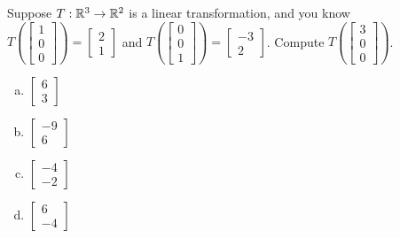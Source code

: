 \begin{applicationActivities}{1}{17}
\begin{activity}{5}
Suppose $T: \mathbb{R}^3 \rightarrow \mathbb{R}^2$ is a linear transformation, and you know $T\left(\begin{bmatrix} 1 \\ 0 \\ 0 \end{bmatrix} \right) = \begin{bmatrix} 2 \\ 1 \end{bmatrix} $ and $T\left(\begin{bmatrix} 0 \\ 0 \\ 1 \end{bmatrix} \right) = \begin{bmatrix} -3 \\ 2 \end{bmatrix} $.  Compute $T\left(\begin{bmatrix} 3 \\ 0 \\ 0 \end{bmatrix}\right)$.
\begin{multicols}{2}
\begin{enumerate}[(a)]
\item $\begin{bmatrix} 6 \\ 3\end{bmatrix}$
\item $\begin{bmatrix} -9 \\ 6 \end{bmatrix}$
\item $\begin{bmatrix} -4 \\ -2 \end{bmatrix}$
\item $\begin{bmatrix} 6 \\ -4 \end{bmatrix}$
\end{enumerate}
\end{multicols}
\end{activity}


\end{applicationActivities}
